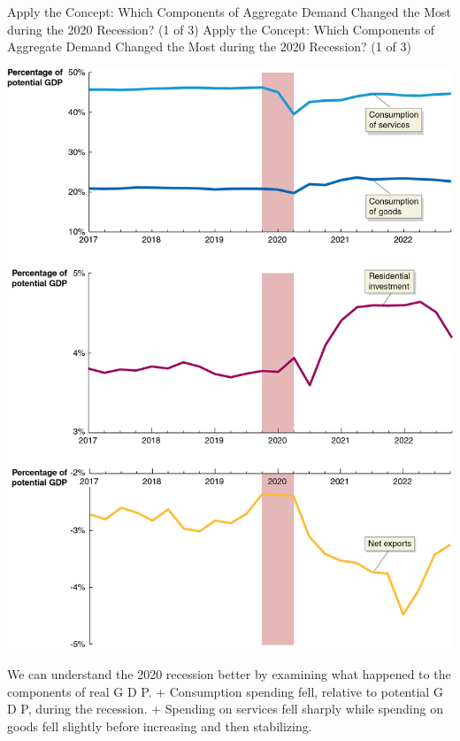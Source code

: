 \documentclass[
  12pt,
  ignorenonframetext,
]{beamer}
\begin{document}
\begin{frame}{Apply the Concept: Which Components of Aggregate Demand
Changed the Most during the 2020 Recession? (1 of 3)}
\protect\hypertarget{apply-the-concept-which-components-of-aggregate-demand-changed-the-most-during-the-2020-recession-1-of-3}{}
Apply the Concept: Which Components of Aggregate Demand Changed the Most
during the 2020 Recession? (1 of 3)

\includegraphics[width=\textwidth,height=0.99\textheight]{imgs3/img_slide17a.png}

We can understand the 2020 recession better by examining what happened
to the components of real G D P. + Consumption spending fell, relative
to potential G D P, during the recession. + Spending on services fell
sharply while spending on goods fell slightly before increasing and then
stabilizing.
\end{frame}
\end{document}
